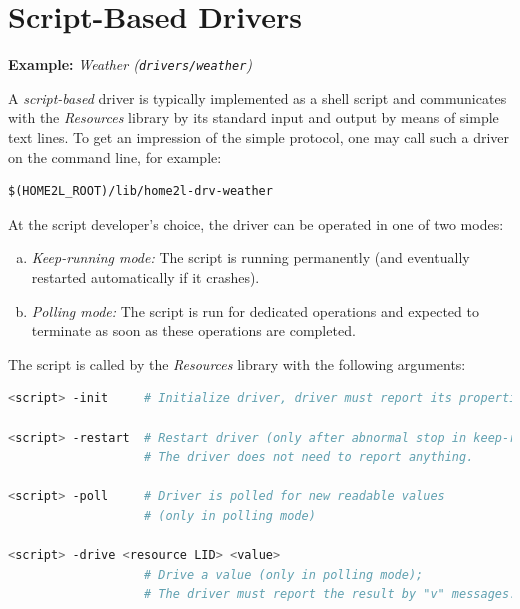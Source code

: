\documentclass[12pt,english,parskip=half]{scrreprt}
\begin{document}
\section{Script-Based Drivers}
\label{sec:drvdev-external}


\textbf{Example:} \emph{Weather (\texttt{drivers/weather})}

A \emph{script-based} driver is typically implemented as a shell script
and communicates with the \emph{Resources} library by its standard input
and output by means of simple text lines. To get an impression of the
simple protocol, one may call such a driver on the command line, for example:

\begin{lstlisting}
$(HOME2L_ROOT)/lib/home2l-drv-weather
\end{lstlisting}

At the script developer's choice, the driver can be operated in one of
two modes:

\begin{enumerate}[a)]

\item
  \emph{Keep-running mode:} The script is running permanently (and
  eventually restarted automatically if it crashes).

\item
  \emph{Polling mode:} The script is run for dedicated operations and
  expected to terminate as soon as these operations are completed.

\end{enumerate}

The script is called by the \emph{Resources} library with the following arguments:

\begin{lstlisting}[language=bash]
<script> -init     # Initialize driver, driver must report its properties (see below)

<script> -restart  # Restart driver (only after abnormal stop in keep-running mode);
                   # The driver does not need to report anything.

<script> -poll     # Driver is polled for new readable values 
                   # (only in polling mode)

<script> -drive <resource LID> <value>
                   # Drive a value (only in polling mode);
                   # The driver must report the result by "v" messages.
\end{lstlisting}
\end{document}
